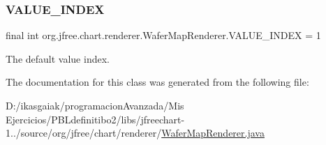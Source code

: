 \subsubsection{\texorpdfstring{V\+A\+L\+U\+E\+\_\+\+I\+N\+D\+EX}{VALUE\_INDEX}}
{\footnotesize\ttfamily final int org.\+jfree.\+chart.\+renderer.\+Wafer\+Map\+Renderer.\+V\+A\+L\+U\+E\+\_\+\+I\+N\+D\+EX = 1\hspace{0.3cm}{\ttfamily [static]}}

The default value index. 

The documentation for this class was generated from the following file\+:\begin{DoxyCompactItemize}
\item 
D\+:/ikasgaiak/programacion\+Avanzada/\+Mis Ejercicios/\+P\+B\+Ldefinitibo2/libs/jfreechart-\/1../source/org/jfree/chart/renderer/\mbox{\hyperlink{_wafer_map_renderer_8java}{Wafer\+Map\+Renderer.\+java}}\end{DoxyCompactItemize}
